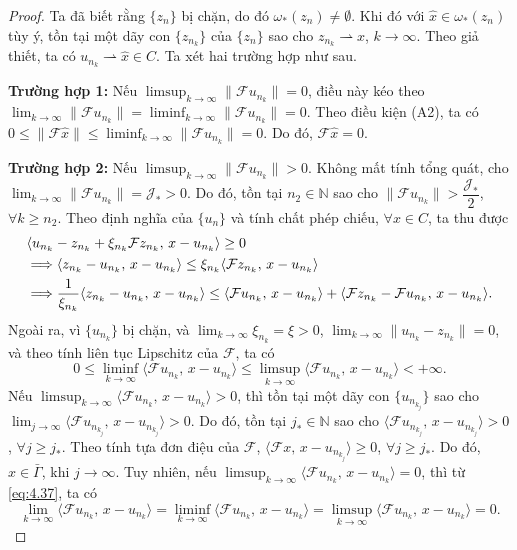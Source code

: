 \documentclass{MyBook}
\theoremstyle{plain}
\theoremstyle{definition}
\theoremstyle{remark}
\numberwithin{equation}{chapter}
\newcommand{\Fc}{\mathcal{F}}
\newcommand{\inp}[2]{\langle #1,\,#2\rangle}
\newcommand{\nm}[1]{\lVert #1\rVert}
\newcommand{\wto}{\rightharpoonup}
\newcommand{\N}{\mathbb{N}}
\newcommand{\Gam}{\bar{\Gamma}}
\begin{document}
\begin{proof}
Ta đã biết rằng $\{z_n\}$ bị chặn, do đó $\omega_{*}(z_n)\ne\emptyset$. Khi đó với $\hat{x}\in\omega_{*}(z_n)$ tùy ý, tồn tại một dãy con $\{z_{n_k}\}$ của $\{z_n\}$ sao cho $z_{n_k}\wto\hat{x}$, $k\to\infty$. Theo giả thiết, ta có $u_{n_k}\wto\hat{x}\in C$. Ta xét hai trường hợp như sau.

\medskip
\noindent\textbf{Trường hợp 1:} Nếu $\limsup_{k\to\infty}\nm{\Fc u_{n_k}}=0$, điều này kéo theo $\lim_{k\to\infty}\nm{\Fc u_{n_k}}=\liminf_{k\to\infty}\nm{\Fc u_{n_k}}=0$. Theo điều kiện (A2), ta có $0\le\nm{\Fc\hat{x}}\le\liminf_{k\to\infty}\nm{\Fc u_{n_k}}=0$. Do đó, $\Fc\hat{x}=0$.

\medskip
\noindent\textbf{Trường hợp 2:} Nếu $\limsup_{k\to\infty}\nm{\Fc u_{n_k}}>0$. Không mất tính tổng quát, cho $\lim_{k\to\infty}\nm{\Fc u_{n_k}}=\mathcal{J}_{*}>0$. Do đó, tồn tại $n_2\in\N$ sao cho $\nm{\Fc u_{n_k}}>\dfrac{\mathcal{J}_{*}}{2}$, $\forall k\ge n_2$. Theo định nghĩa của $\{u_n\}$ và tính chất phép chiếu, $\forall x\in C$, ta thu được
\begin{align}
&\inp{u_{n_k}-z_{n_k}+\xi_{n_k}\Fc z_{n_k}}{x-u_{n_k}}\ge 0\notag\\
&\Longrightarrow \inp{z_{n_k}-u_{n_k}}{x-u_{n_k}}\le\xi_{n_k}\inp{\Fc z_{n_k}}{x-u_{n_k}}\notag\\
&\Longrightarrow \frac{1}{\xi_{n_k}}\inp{z_{n_k}-u_{n_k}}{x-u_{n_k}}\le\inp{\Fc u_{n_k}}{x-u_{n_k}}+\inp{\Fc z_{n_k}-\Fc u_{n_k}}{x-u_{n_k}}. \label{eq:4.36}
\end{align}
Ngoài ra, vì $\{u_{n_k}\}$ bị chặn, và $\lim_{k\to\infty}\xi_{n_k}=\xi>0$, $\lim_{k\to\infty}\nm{u_{n_k}-z_{n_k}}=0$, và theo tính liên tục Lipschitz của $\Fc$, ta có
\begin{equation}
0\le\liminf_{k\to\infty}\inp{\Fc u_{n_k}}{x-u_{n_k}}\le\limsup_{k\to\infty}\inp{\Fc u_{n_k}}{x-u_{n_k}}<+\infty. \label{eq:4.37}
\end{equation}
Nếu $\limsup_{k\to\infty}\inp{\Fc u_{n_k}}{x-u_{n_k}}>0$, thì tồn tại một dãy con $\{u_{n_{k_j}}\}$ sao cho $\lim_{j\to\infty}\inp{\Fc u_{n_{k_j}}}{x-u_{n_{k_j}}}>0$. Do đó, tồn tại $j_{*}\in\N$ sao cho $\inp{\Fc u_{n_{k_j}}}{x-u_{n_{k_j}}}>0$, $\forall j\ge j_{*}$. Theo tính tựa đơn điệu của $\Fc$, $\inp{\Fc x}{x-u_{n_{k_j}}}\ge 0$, $\forall j\ge j_{*}$. Do đó, $\hat{x}\in\Gam$, khi $j\to\infty$. Tuy nhiên, nếu $\limsup_{k\to\infty}\inp{\Fc u_{n_k}}{x-u_{n_k}}=0$, thì từ \eqref{eq:4.37}, ta có
\[
\lim_{k\to\infty}\inp{\Fc u_{n_k}}{x-u_{n_k}}=\liminf_{k\to\infty}\inp{\Fc u_{n_k}}{x-u_{n_k}}=\limsup_{k\to\infty}\inp{\Fc u_{n_k}}{x-u_{n_k}}=0.
\]
\end{proof}
\end{document}
